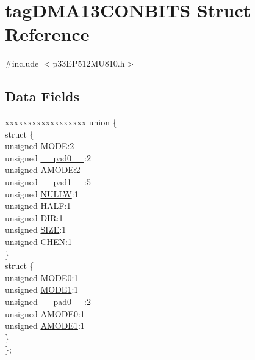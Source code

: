 \hypertarget{structtag_d_m_a13_c_o_n_b_i_t_s}{}\section{tag\+D\+M\+A13\+C\+O\+N\+B\+I\+TS Struct Reference}
\label{structtag_d_m_a13_c_o_n_b_i_t_s}


{\ttfamily \#include $<$p33\+E\+P512\+M\+U810.\+h$>$}

\subsection*{Data Fields}
\begin{DoxyCompactItemize}
\item 
\begin{tabbing}
xx\=xx\=xx\=xx\=xx\=xx\=xx\=xx\=xx\=\kill
union \{\\
\>struct \{\\
\>\>unsigned \hyperlink{structtag_d_m_a13_c_o_n_b_i_t_s_adc56ba18ff3f1599c85d222bee624424}{MODE}:2\\
\>\>unsigned \hyperlink{structtag_d_m_a13_c_o_n_b_i_t_s_adf71f3d8410c1f1dbbc96680a92c49af}{\_\_pad0\_\_}:2\\
\>\>unsigned \hyperlink{structtag_d_m_a13_c_o_n_b_i_t_s_ab3ff4e1f1b9a1037418ca7b6cb2e8f77}{AMODE}:2\\
\>\>unsigned \hyperlink{structtag_d_m_a13_c_o_n_b_i_t_s_acaf2d0924a107ec6e8d2e31febaf66f9}{\_\_pad1\_\_}:5\\
\>\>unsigned \hyperlink{structtag_d_m_a13_c_o_n_b_i_t_s_a1d3f7d04416314131889d1671a9287ad}{NULLW}:1\\
\>\>unsigned \hyperlink{structtag_d_m_a13_c_o_n_b_i_t_s_a1a715a64b2576f59401ac93d6f9a086a}{HALF}:1\\
\>\>unsigned \hyperlink{structtag_d_m_a13_c_o_n_b_i_t_s_ad6868749602045a76f36ffdf964dfd39}{DIR}:1\\
\>\>unsigned \hyperlink{structtag_d_m_a13_c_o_n_b_i_t_s_a5863cac6dc2cb330bdd0b1c66da70ffe}{SIZE}:1\\
\>\>unsigned \hyperlink{structtag_d_m_a13_c_o_n_b_i_t_s_a092934036fdfb8df5259db288fe438ca}{CHEN}:1\\
\>\} \\
\>struct \{\\
\>\>unsigned \hyperlink{structtag_d_m_a13_c_o_n_b_i_t_s_abc938903e74bff48935569d0c5b19035}{MODE0}:1\\
\>\>unsigned \hyperlink{structtag_d_m_a13_c_o_n_b_i_t_s_a7a9f7514566d0626724ce6c4b81b5ea2}{MODE1}:1\\
\>\>unsigned \hyperlink{structtag_d_m_a13_c_o_n_b_i_t_s_adf71f3d8410c1f1dbbc96680a92c49af}{\_\_pad0\_\_}:2\\
\>\>unsigned \hyperlink{structtag_d_m_a13_c_o_n_b_i_t_s_a0a1f894a2695c1388a5412244636805b}{AMODE0}:1\\
\>\>unsigned \hyperlink{structtag_d_m_a13_c_o_n_b_i_t_s_a3fde4abc0dc3db6fef6afc28c565ce3e}{AMODE1}:1\\
\>\} \\
\}; \\


\end{tabbing}
\end{DoxyCompactItemize}
